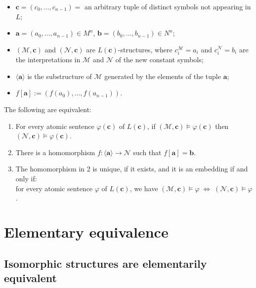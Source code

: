 \documentclass[a4paper,UKenglish,cleveref,autoref,thm-restate,12pt]{lipics-v2021-wjd}
\newcommand{\<}{\langle}
\renewcommand{\>}{\rangle}
\begin{document}
\begin{itemize}
\item
  \(\mathbf c = (c_0, \dots, c_{n-1})=\) an arbitrary tuple of distinct
  symbols not appearing in \(L\);
\item
  \(\mathbf a = (a_0, \dots, a_{n-1}) \in M^n\),
  \(\mathbf b = (b_0, \dots, b_{n-1}) \in N^n\);
\item
  \((\mathcal M, \mathbf c)\) and \((\mathcal N, \mathbf c)\) are
  \(L(\mathbf c)\)-structures, where \(c_i^{\mathcal M} = a_i\) and
  \(c_i^{\mathcal N} = b_i\) are the interpretations in \(\mathcal M\)
  and \(\mathcal N\) of the new constant symbols;
\item
  \(\langle \mathbf a \rangle\) is the substructure of \(\mathcal M\)
  generated by the elements of the tuple \(\mathbf a\);
\item
  \(f[\mathbf a]:=(f(a_0), \dots, f(a_{n-1}))\).
\end{itemize}

\begin{lemma} The following are equivalent:\\
  \begin{enumerate}
  \item For every atomic sentence \(\varphi(\mathbf c)\) of \(L(\mathbf c)\),
if \((\mathcal M, \mathbf c) \vDash \varphi(\mathbf c)\) then
\((\mathcal N, \mathbf c) \vDash \varphi(\mathbf c)\). 
\item There is a
homomorphism \(f \colon \langle \mathbf a \rangle \to \mathcal N\) such
that \(f[\mathbf a] = \mathbf b\).\\
\item The homomorphism in 2 is unique, if it exists, and it is an embedding
if and only if:\\
for every atomic sentence \(\varphi\) of \(L(\mathbf c)\), we have
\((\mathcal M, \mathbf c) \vDash \varphi \; \Leftrightarrow \; (\mathcal N, \mathbf c) \vDash \varphi\).
  \end{enumerate}
\end{lemma}

\section{Elementary equivalence}\label{elementary-equivalence}

\subsection{Isomorphic structures are elementarily
equivalent}\label{isomorphic-structures-are-elementarily-equivalent}
\end{document}
